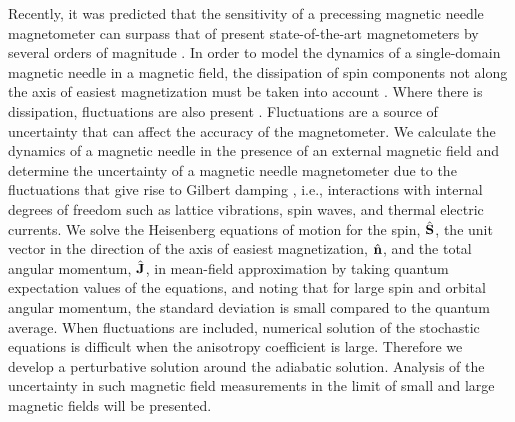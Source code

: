 Recently, it was predicted that the sensitivity of a precessing magnetic needle magnetometer can surpass that of present state-of-the-art magnetometers by several orders of magnitude \cite{Jackson_Kimball_2016}.  In order to model the dynamics of a single-domain magnetic needle in a magnetic field, the dissipation of spin components not along the axis of easiest magnetization must be taken into account \cite{Gilbert_2004}. Where there is dissipation, fluctuations are also present \cite{Callen_1951}.  Fluctuations are a source of uncertainty that can affect the accuracy of the magnetometer.  We calculate the dynamics of a magnetic needle in the presence of an external magnetic field and determine the uncertainty of a magnetic needle magnetometer due to the fluctuations that give rise to Gilbert damping \cite{Gilbert_2004}, i.e., interactions with internal degrees of freedom such as lattice vibrations, spin waves, and thermal electric currents.  We solve the Heisenberg equations of motion for the spin, ${\hat {\bf S}}$, the unit vector in the direction of the axis of easiest magnetization, ${\hat {\bf n}}$, and the total angular momentum,  ${\hat {\bf J}}$, in mean-field approximation \cite{Band_2013}  by taking quantum expectation values of the equations, and noting that for large spin and orbital angular momentum, the standard deviation is small compared to the quantum average.   When fluctuations are included, numerical solution of the stochastic equations is difficult when the anisotropy coefficient is large.  Therefore we develop a perturbative solution around the adiabatic solution.  Analysis of the uncertainty in such magnetic field measurements in the limit of small and large magnetic fields will be presented.